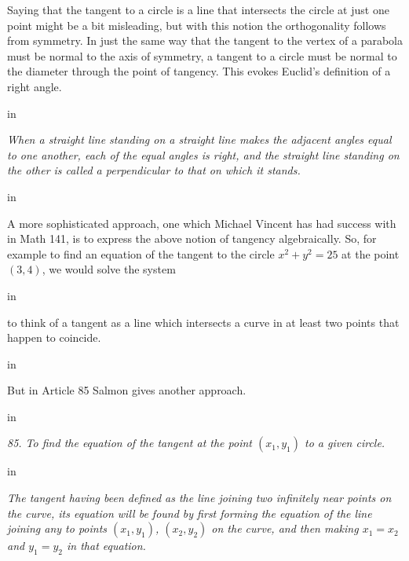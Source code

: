 \documentclass{ximera}
\newcommand{\pskip}{\vskip 0.1 in}
\begin{document}
Saying that the tangent to a circle is a line that intersects the circle at just one point might be a bit misleading, but with this notion the orthogonality follows from symmetry. In just the same way that the tangent to the vertex of a parabola must be normal to the axis of symmetry, a tangent to a circle must be normal to the diameter through the point of tangency. This evokes Euclid's definition of a right angle.

\pskip

\emph{When a straight line standing on a straight line makes the adjacent angles equal to one another, each of the equal angles is right, and the straight line standing on the other is called a perpendicular to that on which it stands.}

\pskip

A more sophisticated approach, one which Michael Vincent has had success with in Math 141, is to express the above notion of tangency algebraically. So, for example to find an equation of the tangent to the circle $x^2 +y^2  = 25$ at the point $(3,4)$, we would solve the system
 
\pskip

to think of a tangent as a line which intersects a curve in at least two points that happen to coincide.

\pskip

But in Article 85 Salmon gives another approach.

\pskip

\emph{85. To find the equation of the tangent at the point $(x_1,y_1)$ to a given circle.}

\pskip

\emph{The tangent having been defined as the line joining two infinitely near points on the curve, its equation will be found by first forming the equation of the line joining any to points $(x_1, y_1)$, $(x_2, y_2)$ on the curve, and then making $x_1=x_2$ and $y_1=y_2$ in that equation.}
\end{document}
